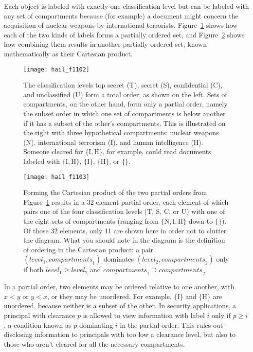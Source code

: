 Each object is labeled with exactly one
classification level  but can be
labeled with any set of compartments because (for example) a document
might concern the acquisition of nuclear weapons by international
terrorists.  Figure~\ref{scan-11-2} shows how each of the two kinds of
labels forms a partially ordered set, and Figure~\ref{scan-11-3}
shows how combining them results in another partially ordered set,
known mathematically as their Cartesian product.
\begin{figure}
\centerline{\texttt{[image: hail\_f1102]}}
\caption{The classification levels top secret (T), secret (S),
  confidential (C), and unclassified (U) form a total order, as shown
  on the left.  Sets of compartments, on the other hand, form only a
  partial order, namely the subset order in which one set of
  compartments is below another if it has a subset of the other's
  compartments.  This is illustrated on the right with three
  hypothetical compartments: nuclear weapons (N), international
  terrorism (I), and human intelligence (H).  Someone cleared for
  $\lbrace \textrm{I}, \textrm{H} \rbrace$, for example, could read documents labeled
  with $\lbrace \textrm{I}, \textrm{H} \rbrace$, $\lbrace \textrm{I} \rbrace$, $\lbrace \textrm{H}
  \rbrace$, or $\lbrace \rbrace$.}
\label{scan-11-2}
\end{figure}
\begin{figure}
\centerline{\texttt{[image: hail\_f1103]}}
\caption{Forming the Cartesian product of the two partial orders from Figure~\ref{scan-11-2}
  results in a 32-element partial order, each element of which
  pairs one of the four classification levels (T, S, C, or U) with one of
  the eight sets of compartments (ranging from $\lbrace \textrm{N}, \textrm{I}, \textrm{H}
  \rbrace$ down to $\lbrace \rbrace$).  Of those 32 elements, only 11
  are shown here in order not to clutter the diagram.  What you should
  note in the diagram is the definition of ordering in the Cartesian
  product: a pair $(\textit{level}_1, \textit{compartments}_1)$
  dominates $(\textit{level}_2, \textit{compartments}_2)$ only if both
  $\textit{level}_1 \geq \textit{level}_2$ and
  $\textit{compartments}_1 \supseteq \textit{compartments}_2$.}
\label{scan-11-3}
\end{figure}

In a partial order, two elements may be ordered relative to one
another, with $x < y$ or $y < x$, or they may be unordered.  For
example, $\lbrace \textrm{I} \rbrace$ and $\lbrace \textrm{H} \rbrace$ are unordered,
because neither is a subset of the other.  In security applications, a
principal with clearance $p$ is allowed to view information with label
$i$ only if $p \geq i$, a condition known as $p$ dominating $i$ in the
partial order.  This rules out disclosing information to
principals with too low a clearance level, but also to those who
aren't cleared for all the necessary compartments.

